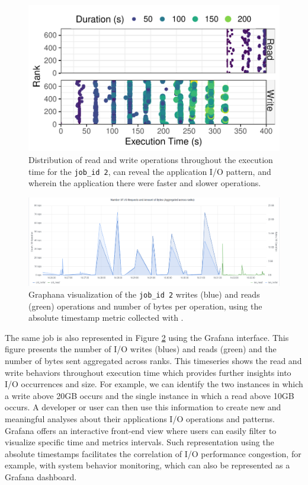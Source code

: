 \begin{figure}
	\centering
	\includegraphics[width=\linewidth]{figs/255653_mpi_io_luster_no_coll_execution2.pdf}
	\caption{Distribution of read and write operations
          throughout the execution time for the \texttt{job\_id 2},
          can reveal the application I/O pattern, and wherein the
          application there were faster and slower operations.}
	\label{f:mpi_io}
\end{figure}
\begin{figure}
	\centering
	\includegraphics[width=\textwidth]{figs/255653_mpi_io_luster_no_coll.pdf}
	\caption{Graphana visualization of the \texttt{job\_id 2}
          writes (blue) and reads (green) operations and number of bytes per
          operation, using the absolute timestamp metric collected
	  with \Darshan{}.}
	  \label{f:mpi_io_grafana}
\end{figure}

The same job is also represented in Figure \ref{f:mpi_io_grafana}
using the Grafana interface. This figure presents the number of I/O
writes (blues) and reads (green) and the number of bytes sent
aggregated across ranks. This timeseries shows the read and write behaviors throughout execution time which provides further insights into I/O occurrences and size. For example, we can identify the two instances in which a write above 20GB occurs and the single instance in which a read above 10GB occurs. A developer or user can then use this information to create new and meaningful analyses about their applications I/O operations and patterns. Grafana offers an interactive front-end
view where users can easily filter to visualize specific time and
metrics intervals. Such representation using the absolute timestamps
facilitates the correlation of I/O performance congestion, for
example, with system behavior monitoring, which can also be
represented as a Grafana dashboard.


